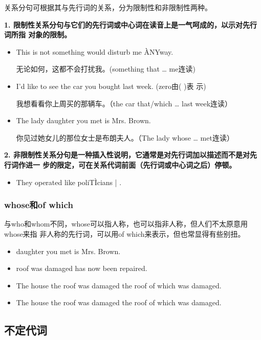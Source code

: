 关系分句可根据其与先行词的关系，分为限制性和非限制性两种。

\textbf{1. 限制性关系分句与它们的先行词或中心词在读音上是一气呵成的，以示对先行词所指
  对象的限制。}
\begin{itemize}
\item This is not something  would disturb me \`{A}NYway.

  无论如何，这都不会打扰我。(something that \ldots{} me连读)
\item I'd like to see the car  you bought last week. (zero由( )表
  示)

  我想看看你上周买的那辆车。（the car that/which \ldots{} last week连读）
\item The lady  daughter you met is Mrs. Brown.

  你见过她女儿的那位女士是布朗夫人。（The lady whose \ldots{} met连读）
\end{itemize}

\textbf{2. 非限制性关系分句是一种插入性说明，它通常是对先行词加以描述而不是对先行词作进一
  步的限定，可在关系代词前面（先行词或中心词之后）停顿。}
\begin{itemize}
\item  They operated like poliT\`{I}cians | .
\end{itemize}

\subsubsection{whose和of which}

与who和whom不同，whose可以指人称，也可以指非人称，但人们不太原意用whose来指
非人称的先行词，可以用of which来表示，但也常显得有些别扭。
\begin{itemize}
\item {} daughter you met is Mrs. Brown.
\item {} roof was damaged has now been repaired.
\item The house  the roof was damaged the roof of which was damaged.
\item The house the roof  was damaged the roof of which was damaged.
\end{itemize}

\subsection{不定代词}

